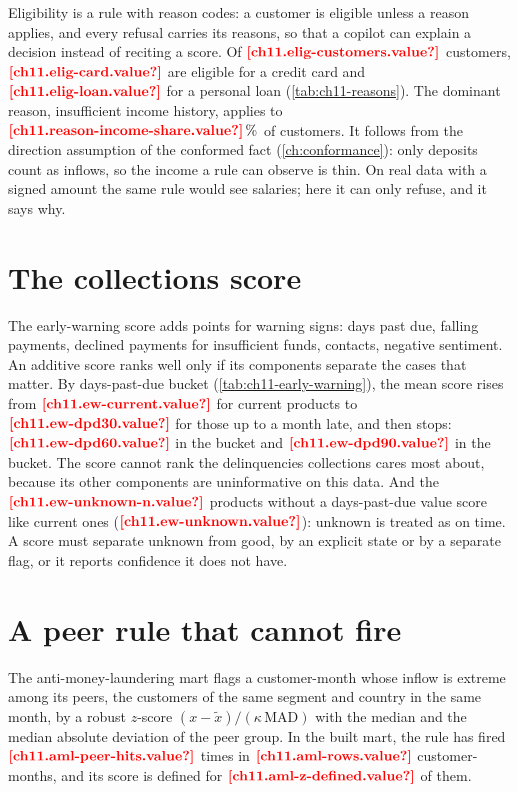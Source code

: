 Eligibility is a rule with reason codes: a customer is eligible unless a reason applies, and every refusal carries its
reasons, so that a copilot can explain a decision instead of reciting a score. Of $\est{ch11.elig-customers}{value}$
customers, $\est{ch11.elig-card}{value}$ are eligible for a credit card and $\est{ch11.elig-loan}{value}$ for a personal loan
(\cref{tab:ch11-reasons}). The dominant reason, insufficient income history, applies to
$\est{ch11.reason-income-share}{value}\,\%$ of customers. It follows from the direction assumption of the conformed fact
(\cref{ch:conformance}): only deposits count as inflows, so the income a rule can observe is thin. On real data with a
signed amount the same rule would see salaries; here it can only refuse, and it says why.



\section{The collections score}\label{sec:mf-collections}

The early-warning score adds points for warning signs: days past due, falling payments, declined payments for
insufficient funds, contacts, negative sentiment. An additive score ranks well only if its components separate the cases
that matter. By days-past-due bucket (\cref{tab:ch11-early-warning}), the mean score rises from
$\est{ch11.ew-current}{value}$ for current products to $\est{ch11.ew-dpd30}{value}$ for those up to a month late, and then
stops: $\est{ch11.ew-dpd60}{value}$ in the  bucket and $\est{ch11.ew-dpd90}{value}$ in the  bucket. The
score cannot rank the delinquencies collections cares most about, because its other components are uninformative on this
data. And the $\est{ch11.ew-unknown-n}{value}$ products without a days-past-due value score like current ones
($\est{ch11.ew-unknown}{value}$): unknown is treated as on time. A score must separate unknown from good, by an explicit
state or by a separate flag, or it reports confidence it does not have.



\section{A peer rule that cannot fire}\label{sec:mf-aml}

The anti-money-laundering mart flags a customer-month whose inflow is extreme among its peers, the customers of the same
segment and country in the same month, by a robust $z$-score $(x - \tilde x) / (\kappa\,\mathrm{MAD})$ with the median and
the median absolute deviation of the peer group. In the built mart, the rule has fired $\est{ch11.aml-peer-hits}{value}$
times in $\est{ch11.aml-rows}{value}$ customer-months, and its score is defined for $\est{ch11.aml-z-defined}{value}$ of them.

